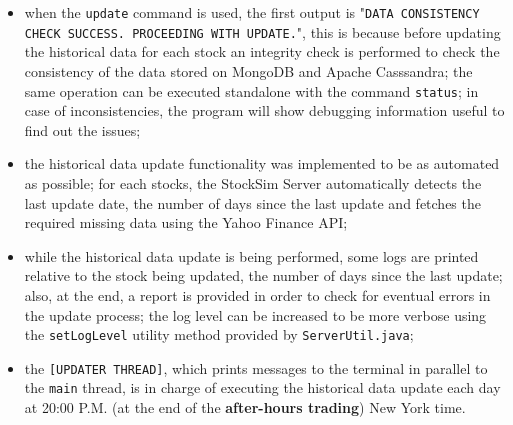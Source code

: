 \begin{itemize}
    \item when the \texttt{update} command is used, the first output is
    "\texttt{DATA CONSISTENCY CHECK SUCCESS. PROCEEDING WITH UPDATE.}", this is
    because before updating the historical data for each stock an integrity
    check is performed to check the consistency of the data stored on MongoDB
    and Apache Casssandra; the same operation can be executed standalone with
    the command \texttt{status}; in case of inconsistencies, the program will
    show debugging information useful to find out the issues;
    \item the historical data update functionality was implemented to be as
    automated as possible; for each stocks, the StockSim Server automatically
    detects the last update date, the number of days since the last update and
    fetches the required missing data using the Yahoo Finance API;
    \item while the historical data update is being performed, some logs are
    printed relative to the stock being updated, the number of days since the
    last update; also, at the end, a report is provided in order to check for
    eventual errors in the update process; the log level can be increased to be
    more verbose using the \texttt{setLogLevel} utility method provided by
    \texttt{ServerUtil.java};
    \item the \texttt{[UPDATER THREAD]}, which prints messages to the terminal
    in parallel to the \texttt{main} thread, is in charge of executing the
    historical data update each day at 20:00 P.M. (at the end of the
    \textbf{after-hours trading}) New York time.
\end{itemize}
